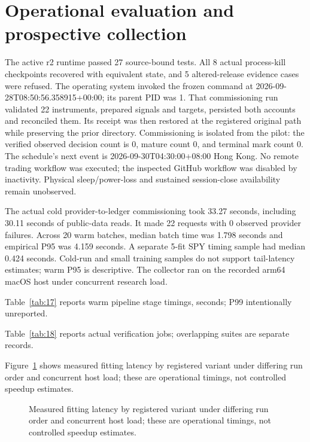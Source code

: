 \section{Operational evaluation and prospective collection}\label{sec:section-09}

The active r2 runtime passed 27 source-bound tests. All 8 actual process-kill checkpoints recovered with equivalent state, and 5 altered-release evidence cases were refused. The operating system invoked the frozen command at 2026-09-28T08:50:56.358915+00:00; its parent PID was 1. That commissioning run validated 22 instruments, prepared signals and targets, persisted both accounts and reconciled them. Its receipt was then restored at the registered original path while preserving the prior directory. Commissioning is isolated from the pilot: the verified observed decision count is 0, mature count 0, and terminal mark count 0. The schedule's next event is 2026-09-30T04:30:00+08:00 Hong Kong. No remote trading workflow was executed; the inspected GitHub workflow was disabled by inactivity. Physical sleep/power-loss and sustained session-close availability remain unobserved.

The actual cold provider-to-ledger commissioning took 33.27 seconds, including 30.11 seconds of public-data reads. It made 22 requests with 0 observed provider failures. Across 20 warm batches, median batch time was 1.798 seconds and empirical P95 was 4.159 seconds. A separate 5-fit SPY timing sample had median 0.424 seconds. Cold-run and small training samples do not support tail-latency estimates; warm P95 is descriptive. The collector ran on the recorded arm64 macOS host under concurrent research load.

\noindent Table~\ref{tab:17} reports warm pipeline stage timings, seconds; P99 intentionally unreported.



\noindent Table~\ref{tab:18} reports actual verification jobs; overlapping suites are separate records.



\noindent Figure~\ref{fig:13} shows measured fitting latency by registered variant under differing run order and concurrent host load; these are operational timings, not controlled speedup estimates.

\begin{figure}[htbp]\centering

\caption{Measured fitting latency by registered variant under differing run order and concurrent host load; these are operational timings, not controlled speedup estimates.}\label{fig:13}
\end{figure}

